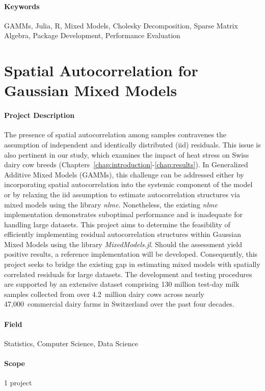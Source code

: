 \paragraph{Keywords} GAMMs, Julia, R, Mixed Models, Cholesky Decomposition, Sparse Matrix Algebra, Package Development, Performance Evaluation

\newpage

\section{Spatial Autocorrelation for Gaussian Mixed Models}
\paragraph{Project Description} The presence of spatial autocorrelation among samples contravenes the assumption of independent and identically distributed (iid) residuals. This issue is also pertinent in our study, which examines the impact of heat stress on Swiss dairy cow breeds (Chapters~\ref{chap:introduction}-\ref{chap:results}). In Generalized Additive Mixed Models (GAMMs), this challenge can be addressed either by incorporating spatial autocorrelation into the systemic component \citep{dupont_spatial_2020} of the model or by relaxing the iid assumption to estimate autocorrelation structures \citep{StackExchange_GAM_Spatial_Autocorrelation} via mixed models using the library \textit{nlme}. Nonetheless, the existing \textit{nlme} implementation demonstrates suboptimal performance and is inadequate for handling large datasets. This project aims to determine the feasibility of efficiently implementing residual autocorrelation structures within Gaussian Mixed Models using the library \textit{MixedModels.jl}. Should the assessment yield positive results, a reference implementation will be developed. Consequently, this project seeks to bridge the existing gap in estimating mixed models with spatially correlated residuals for large datasets. The development and testing procedures are supported by an extensive dataset comprising 130 million test-day milk samples collected from over 4.2~million dairy cows across nearly 47,000~commercial dairy farms in Switzerland over the past four decades.

\paragraph{Field} Statistics, Computer Science, Data Science
\paragraph{Scope} 1 project
